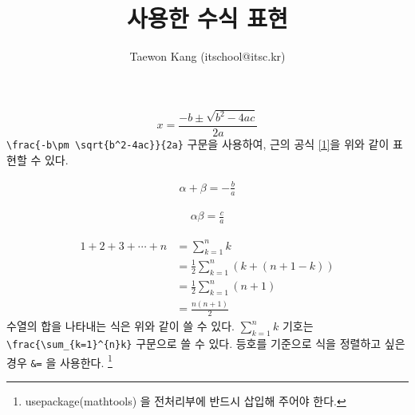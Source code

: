 \documentclass{oblivoir}
\author{Taewon Kang (itschool@itsc.kr)}
\title{\TeX을 사용한 수식 표현}
\begin{document}
	\maketitle
		\begin{equation} 
			x = \frac{-b\pm \sqrt{b^2-4ac}}{2a} \label{1}
		\end{equation}
		 \verb|\frac{-b\pm \sqrt{b^2-4ac}}{2a}| 구문을 사용하여, 근의 공식 \ref{1}을 위와 같이 표현할 수 있다.
		
		\begin{equation}
			\begin{gathered}
				\alpha + \beta = -\frac{b}{a} \label{2}
			\end{gathered}
		\end{equation}	
			
		\begin{equation}
			\begin{gathered}
				\alpha \beta = \frac{c}{a} \label{3}
			\end{gathered}
		\end{equation}
		
		\begin{align} %
			1 + 2 + 3 + \cdots + n &= \sum_{k=1}^{n}k \nonumber \\
			&= \frac{1}{2}\sum_{k=1}^{n}(k+(n+1-k)) \nonumber \\
			&= \frac{1}{2}\sum_{k=1}^{n}(n+1) \nonumber \\
			&= \frac{n(n+1)}{2}
		\end{align}
		 수열의 합을 나타내는 식은 위와 같이 쓸 수 있다. $\sum_{k=1}^{n}k$ 기호는 \verb|\frac{\sum_{k=1}^{n}k}| 구문으로 쓸 수 있다. 등호를 기준으로 식을 정렬하고 싶은 경우 \verb|&=| 을 사용한다. 
\footnote{usepackage(mathtools) 을 전처리부에 반드시 삽입해 주어야 한다.}

\vspace{10pt} 
\end{document}
